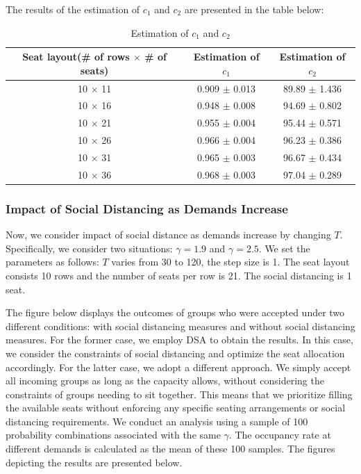 The results of the estimation of $c_1$ and $c_2$ are presented in the table below:

\begin{table}[ht]
  \centering
  \caption{Estimation of $c_1$ and $c_2$}
  \begin{tabular}{|c|c|c|}
  \hline
   Seat layout(\# of rows $\times$ \# of seats) & Estimation of $c_1$ & Estimation of $c_2$  \\
  \hline
   10 $\times$ 11 & 0.909 $\pm$ 0.013  & 89.89 $\pm$ 1.436 \\
   10 $\times$ 16 & 0.948 $\pm$ 0.008  & 94.69 $\pm$ 0.802 \\
   10 $\times$ 21 & 0.955 $\pm$ 0.004 & 95.44 $\pm$ 0.571 \\
   10 $\times$ 26 & 0.966 $\pm$ 0.004 & 96.23 $\pm$ 0.386 \\
   10 $\times$ 31 & 0.965 $\pm$ 0.003 & 96.67 $\pm$ 0.434 \\
   10 $\times$ 36 & 0.968 $\pm$ 0.003 & 97.04 $\pm$ 0.289 \\
   \hline
  \end{tabular}
\end{table}




\subsubsection{Impact of Social Distancing as Demands Increase}
Now, we consider impact of social distance as demands increase by changing $T$. Specifically, we consider two situations: $\gamma = 1.9$ and $\gamma = 2.5$. We set the parameters as follows: $T$ varies from 30 to 120, the step size is 1.  The seat layout consists 10 rows and the number of seats per row is 21. The social distancing is 1 seat.

The figure below displays the outcomes of groups who were accepted under two different conditions: with social distancing measures and without social distancing measures. For the former case, we employ DSA to obtain the results. In this case, we consider the constraints of social distancing and optimize the seat allocation accordingly. For the latter case, we adopt a different approach. We simply accept all incoming groups as long as the capacity allows, without considering the constraints of groups needing to sit together. This means that we prioritize filling the available seats without enforcing any specific seating arrangements or social distancing requirements. We conduct an analysis using a sample of 100 probability combinations associated with the same $\gamma$. The occupancy rate at different demands is calculated as the mean of these 100 samples. The figures depicting the results are presented below.

